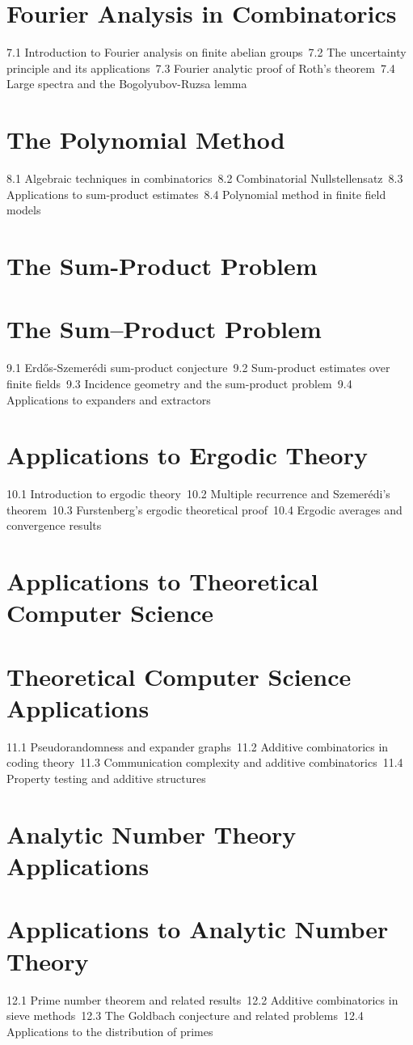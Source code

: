 \section{Fourier Analysis in Combinatorics}
7.1 Introduction to Fourier analysis on finite abelian groups\
7.2 The uncertainty principle and its applications\
7.3 Fourier analytic proof of Roth's theorem\
7.4 Large spectra and the Bogolyubov-Ruzsa lemma\
\section{The Polynomial Method}
8.1 Algebraic techniques in combinatorics\
8.2 Combinatorial Nullstellensatz\
8.3 Applications to sum-product estimates\
8.4 Polynomial method in finite field models\
\section{The Sum-Product Problem}
\section{The Sum–Product Problem}
9.1 Erdős-Szemerédi sum-product conjecture\
9.2 Sum-product estimates over finite fields\
9.3 Incidence geometry and the sum-product problem\
9.4 Applications to expanders and extractors\
\section{Applications to Ergodic Theory}
10.1 Introduction to ergodic theory\
10.2 Multiple recurrence and Szemerédi's theorem\
10.3 Furstenberg's ergodic theoretical proof\
10.4 Ergodic averages and convergence results\
\section{Applications to Theoretical Computer Science}
\section{Theoretical Computer Science Applications}
11.1 Pseudorandomness and expander graphs\
11.2 Additive combinatorics in coding theory\
11.3 Communication complexity and additive combinatorics\
11.4 Property testing and additive structures\
\section{Analytic Number Theory Applications}
\section{Applications to Analytic Number Theory}
12.1 Prime number theorem and related results\
12.2 Additive combinatorics in sieve methods\
12.3 The Goldbach conjecture and related problems\
12.4 Applications to the distribution of primes\

